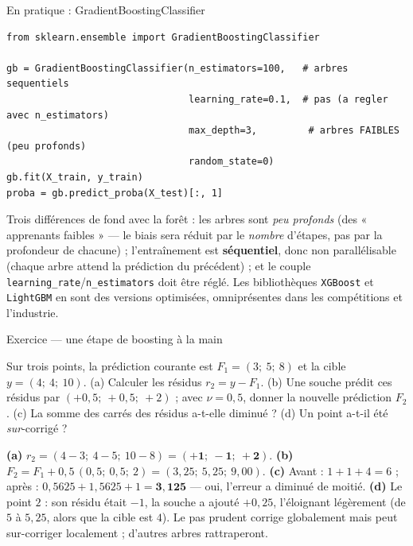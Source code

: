 \documentclass[aspectratio=169,11pt]{beamer}
\begin{document}
\begin{frame}[fragile]{En pratique : GradientBoostingClassifier}
\begin{lstlisting}
from sklearn.ensemble import GradientBoostingClassifier

gb = GradientBoostingClassifier(n_estimators=100,   # arbres sequentiels
                                learning_rate=0.1,  # pas (a regler avec n_estimators)
                                max_depth=3,         # arbres FAIBLES (peu profonds)
                                random_state=0)
gb.fit(X_train, y_train)
proba = gb.predict_proba(X_test)[:, 1]
\end{lstlisting}
{\small Trois différences de fond avec la forêt : les arbres sont \emph{peu profonds} (des « apprenants faibles » — le biais sera réduit par le \emph{nombre} d'étapes, pas par la profondeur de chacune) ; l'entraînement est \textbf{séquentiel}, donc non parallélisable (chaque arbre attend la prédiction du précédent) ; et le couple \texttt{learning\_rate}/\texttt{n\_estimators} doit être réglé. Les bibliothèques \texttt{XGBoost} et \texttt{LightGBM} en sont des versions optimisées, omniprésentes dans les compétitions et l'industrie.}
\end{frame}

\begin{frame}{Exercice — une étape de boosting à la main}
\begin{ucadrec}[Énoncé]
{\small Sur trois points, la prédiction courante est $F_1 = (3;\ 5;\ 8)$ et la cible $y = (4;\ 4;\ 10)$. (a) Calculer les résidus $r_2 = y - F_1$. (b) Une souche prédit ces résidus par $(+0{,}5;\ +0{,}5;\ +2)$ ; avec $\nu = 0{,}5$, donner la nouvelle prédiction $F_2$. (c) La somme des carrés des résidus a-t-elle diminué ? (d) Un point a-t-il été \emph{sur}-corrigé ?}
\end{ucadrec}
\pause
\begin{ucadex}[Correction]
{\small \textbf{(a)} $r_2 = (4-3;\ 4-5;\ 10-8) = (\mathbf{+1;\ -1;\ +2})$. \textbf{(b)} $F_2 = F_1 + 0{,}5\,(0{,}5;\ 0{,}5;\ 2) = (3{,}25;\ 5{,}25;\ 9{,}00)$. \textbf{(c)} Avant : $1 + 1 + 4 = 6$ ; après : $0{,}5625 + 1{,}5625 + 1 = \mathbf{3{,}125}$ — oui, l'erreur a diminué de moitié. \textbf{(d)} Le point $2$ : son résidu était $-1$, la souche a ajouté $+0{,}25$, l'éloignant légèrement (de $5$ à $5{,}25$, alors que la cible est $4$). Le pas prudent corrige globalement mais peut sur-corriger localement ; d'autres arbres rattraperont.}
\end{ucadex}
\end{frame}
\end{document}
